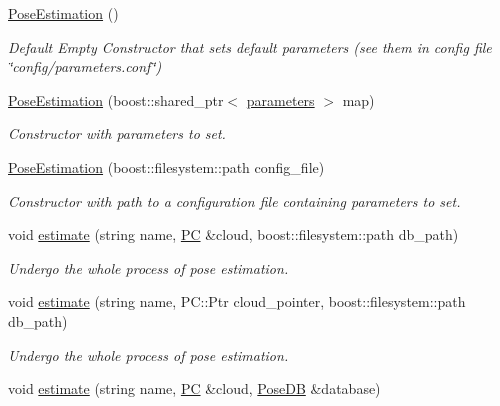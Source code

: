 \begin{DoxyCompactItemize}
\item 
\hyperlink{classPoseEstimation_a47946518bc5a77dea91403373a1245d5}{Pose\-Estimation} ()
\begin{DoxyCompactList}\small\item\em Default Empty Constructor that sets default parameters (see them in config file \char`\"{}config/parameters.\-conf\char`\"{}) \end{DoxyCompactList}\item 
\hyperlink{classPoseEstimation_a81cc6d970e5f5ea3dbfe4a4d142c1949}{Pose\-Estimation} (boost\-::shared\-\_\-ptr$<$ \hyperlink{group__Definitions_gacbb28d8f791bb363852e522cf3b83c47}{parameters} $>$ map)
\begin{DoxyCompactList}\small\item\em Constructor with parameters to set. \end{DoxyCompactList}\item 
\hyperlink{classPoseEstimation_a4fcf971c444b8feb1de5ee99c66533df}{Pose\-Estimation} (boost\-::filesystem\-::path config\-\_\-file)
\begin{DoxyCompactList}\small\item\em Constructor with path to a configuration file containing parameters to set. \end{DoxyCompactList}\item 
void \hyperlink{classPoseEstimation_a252134ff79962856279d25542ef8b8dc}{estimate} (string name, \hyperlink{group__Definitions_ga62eb21fcfa3189c5de50fb62a2a7a79e}{P\-C} \&cloud, boost\-::filesystem\-::path db\-\_\-path)
\begin{DoxyCompactList}\small\item\em Undergo the whole process of pose estimation. \end{DoxyCompactList}\item 
void \hyperlink{classPoseEstimation_af5ca03f98d540a43e71ba2a289e3571c}{estimate} (string name, P\-C\-::\-Ptr cloud\-\_\-pointer, boost\-::filesystem\-::path db\-\_\-path)
\begin{DoxyCompactList}\small\item\em Undergo the whole process of pose estimation. \end{DoxyCompactList}\item 
void \hyperlink{classPoseEstimation_a81ec95cb303bfa5ffc67b9eec14b348d}{estimate} (string name, \hyperlink{group__Definitions_ga62eb21fcfa3189c5de50fb62a2a7a79e}{P\-C} \&cloud, \hyperlink{classPoseDB}{Pose\-D\-B} \&database)

\end{DoxyCompactItemize}
